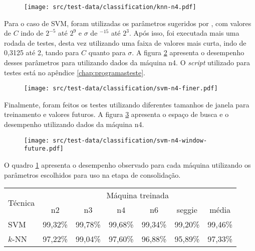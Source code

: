 \begin{figure}[htp]
\centering
\texttt{[image: src/test-data/classification/knn-n4.pdf]}
\label{fig:knnn4}
\end{figure}

Para o caso de SVM, foram utilizadas os parâmetros sugeridos por
, com valores de $C$ indo de $2^{-5}$ até
$2^9$ e $\sigma$ de $^{-15}$ até $2^{3}$.  Após
isso, foi executada mais uma rodada de testes, desta vez utilizando uma
faixa de valores mais curta, indo de 0,3125 até 2, tando para $C$ quanto
para $\sigma$. A figura \ref{fig:svmn4} apresenta o desempenho desses parâmetros
para utilizando dados da máquina n4. O \emph{script} utilizado para testes está no
apêndice \ref{chap:programasteste}.


\begin{figure}[htp]
\centering
\texttt{[image: src/test-data/classification/svm-n4-finer.pdf]}
\label{fig:svmn4}
\end{figure}

Finalmente, foram feitos os testes utilizando diferentes tamanhos de janela
para treinamento e valores futuros. A figura \ref{fig:svmwindowfuturen4} apresenta o
espaço de busca e o desempenho utilizando dados da máquina n4.

\begin{figure}[htp]
\centering
\texttt{[image: src/test-data/classification/svm-n4-window-future.pdf]}
\label{fig:svmwindowfuturen4}
\end{figure}

O quadro \ref{quadro:clageral} apresenta o desempenho observado para cada
máquina utilizando os parâmetros escolhidos para uso na etapa de consolidação.

\begin{table}[htp]
\centering
\hspace{-2cm} %
\label{quadro:clageral}
\begin{tabular}{| l | c | c | c | c | c | c |}
\hline
\multirow{2}{*}{Técnica} & \multicolumn{6}{c|}{Máquina treinada} \\
\cline{2-7}
		& n2      & n3       & n4      	 & n6        & seggie  	 & média   \\
\hline
SVM     	& 99,32\%  & 99,78\% &   99,68\% &   99,34\% &   99,20\% & 99,46\% \\
\hline
$k$-NN  	& 97,22\%  & 99,04\% &   97,60\% &   96,88\% &   95,89\% & 97,33\% \\
\hline
\end{tabular}
\end{table}

